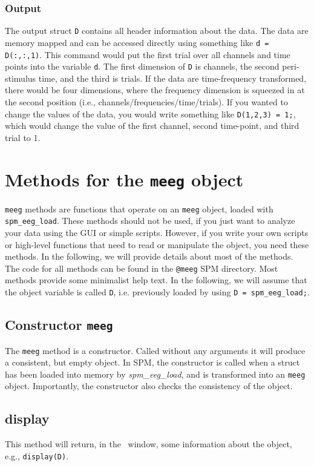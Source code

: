 \subsubsection{Output}
The output struct \texttt{D} contains all header information about the data. The data are memory mapped and can be accessed directly using something like \texttt{d = D(:,:,1)}. This command would put the first trial over all channels and time points into the variable \texttt{d}. The first dimension of \texttt{D} is channels, the second peri-stimulus time, and the third is trials. If the data are time-frequency transformed, there would be four dimensions, where the frequency dimension is squeezed in at the second position (i.e., channels/frequencies/time/trials). If you wanted to change the values of the data, you would write something like \texttt{D(1,2,3) = 1;}, which would change the value of the first channel, second time-point, and third trial to 1.


\section{Methods for the \texttt{meeg} object}
\texttt{meeg} methods are functions that operate on an \texttt{meeg} object, loaded with \texttt{spm\_eeg\_load}. These methods should not be used, if you just want to analyze your data using the GUI or simple scripts. However, if you write your own scripts or high-level functions that need to read or manipulate the object, you need these methods. In the following, we will provide details about most of the methods. The code for all methods can be found in the \texttt{@meeg} SPM directory. Most methods provide some minimalist help text. In the following, we will assume that the object variable is called \texttt{D}, i.e. previously loaded by using \texttt{D = spm\_eeg\_load;}.

\subsection{Constructor \texttt{meeg}}
The \texttt{meeg} method is a constructor. Called without any arguments it will produce a consistent, but empty object. In SPM, the constructor is called when a struct has been loaded into memory by \textit{spm\_eeg\_load}, and is transformed into an \texttt{meeg} object. Importantly, the constructor also checks the consistency of the object.

\subsection{display}
This method will return, in the \matlab\ window, some information about the object, e.g., \texttt{display(D)}.

